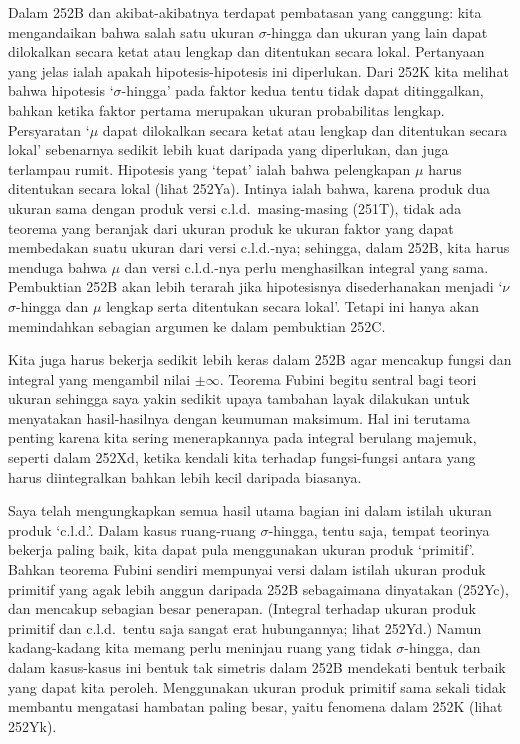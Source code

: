 {Dalam 252B dan akibat-akibatnya terdapat pembatasan yang canggung: kita
mengandaikan bahwa salah satu ukuran $\sigma$-hingga dan ukuran yang lain dapat
dilokalkan secara ketat atau lengkap dan ditentukan secara lokal. Pertanyaan
yang jelas ialah apakah hipotesis-hipotesis ini diperlukan. Dari 252K kita
melihat bahwa hipotesis `$\sigma$-hingga' pada faktor kedua tentu tidak dapat
ditinggalkan, bahkan ketika faktor pertama merupakan ukuran probabilitas
lengkap. Persyaratan `$\mu$ dapat dilokalkan secara ketat atau lengkap dan
ditentukan secara lokal' sebenarnya sedikit lebih kuat daripada yang
diperlukan, dan juga terlampau rumit. Hipotesis yang `tepat' ialah bahwa
pelengkapan $\mu$ harus ditentukan secara lokal (lihat 252Ya). Intinya ialah
bahwa, karena produk dua ukuran sama dengan produk versi c.l.d.\ masing-masing
(251T), tidak ada teorema yang beranjak dari ukuran produk ke ukuran faktor
yang dapat membedakan suatu ukuran dari versi c.l.d.-nya; sehingga, dalam
252B, kita harus menduga bahwa $\mu$ dan versi c.l.d.-nya perlu menghasilkan
integral yang sama. Pembuktian 252B akan lebih terarah jika hipotesisnya
disederhanakan menjadi `$\nu$ $\sigma$-hingga dan $\mu$ lengkap serta
ditentukan secara lokal'. Tetapi ini hanya akan memindahkan sebagian argumen
ke dalam pembuktian 252C.

Kita juga harus bekerja sedikit lebih keras dalam 252B agar mencakup fungsi
dan integral yang mengambil nilai $\pm\infty$. Teorema Fubini begitu sentral
bagi teori ukuran sehingga saya yakin sedikit upaya tambahan layak dilakukan
untuk menyatakan hasil-hasilnya dengan keumuman maksimum. Hal ini terutama
penting karena kita sering menerapkannya pada integral berulang majemuk, seperti
dalam 252Xd, ketika kendali kita terhadap fungsi-fungsi antara yang harus
diintegralkan bahkan lebih kecil daripada biasanya.

Saya telah mengungkapkan semua hasil utama bagian ini dalam istilah ukuran
produk `c.l.d.'. Dalam kasus ruang-ruang $\sigma$-hingga, tentu saja, tempat
teorinya bekerja paling baik, kita dapat pula menggunakan ukuran produk
`primitif'. Bahkan teorema Fubini sendiri mempunyai versi dalam istilah
ukuran produk primitif yang agak lebih anggun daripada 252B sebagaimana
dinyatakan (252Yc), dan mencakup sebagian besar penerapan. (Integral terhadap
ukuran produk primitif dan c.l.d.\ tentu saja sangat erat hubungannya; lihat
252Yd.) Namun kadang-kadang kita memang perlu meninjau ruang yang tidak
$\sigma$-hingga, dan dalam kasus-kasus ini bentuk tak simetris dalam 252B
mendekati bentuk terbaik yang dapat kita peroleh. Menggunakan ukuran produk
primitif sama sekali tidak membantu mengatasi hambatan paling besar, yaitu
fenomena dalam 252K (lihat 252Yk).

}
